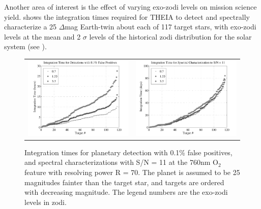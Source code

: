  Another area of interest is the effect of varying exo-zodi levels on  mission science yield.   shows the integration times required for THEIA to detect and spectrally characterize a 25 $\Delta$mag Earth-twin about each of 117 target stars, with exo-zodi levels at the mean and 2 $\sigma$ levels of the historical zodi distribution for the solar system (see ).
 \begin{figure}[ht]
 \begin{center}
  \begin{tabular}{c c}
   \includegraphics[width=2.9in,clip=true,trim=0.25in 0in 0.45in 0.05in]{./figures/detTimes} &
   \includegraphics[width=2.9in,clip=true,trim=0.25in 0in 0.45in 0.05in]{./figures/charTimes}
   \end{tabular}
 \end{center}
 \caption[Integration times for varying exo-zodi levels]{\label{fig:intTimesVarZodi} Integration times for planetary detection with 0.1\% false positives, and spectral characterizations with S/N = 11 at the 760nm O$_2$ feature with resolving power R = 70.  The planet is assumed to be 25 magnitudes fainter than the target star, and targets are ordered with decreasing magnitude.  The legend numbers are the exo-zodi levels in zodi.}
 \end{figure} 
